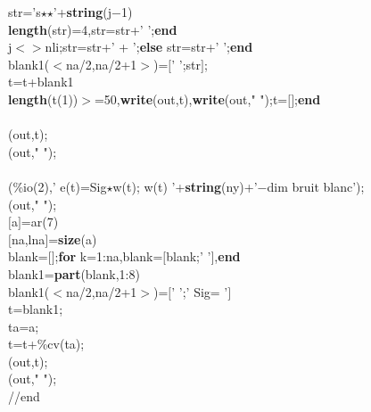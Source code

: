 {\begin{flushleft}
{\cmarg \hspace{1.0cm}str='s$\star$$\star$'+{\bf string}(j$-$1)\\ 
\cmarg \hspace{1.0cm}{\bf if} {\bf length}(str)=4,str=str+' ';{\bf end}\\ 
\cmarg \hspace{1.0cm}{\bf if} j$<$$>$nli;str=str+' + ';{\bf else} str=str+'   ';{\bf end}\\ 
\cmarg \hspace{1.0cm}blank1($<$na/2,na/2+1$>$)=$[$'        ';str$]$;\\ 
\cmarg \hspace{1.0cm}t=t+blank1\\ 
\cmarg \hspace{1.0cm}{\bf if} {\bf length}(t(1))$>$=50,{\bf write}(out,t),{\bf write}(out," ");t=$[$$]$;{\bf end}\\ 
\cmarg \hspace{0.5cm}{\bf end}\\ 
(out,t);\\ 
(out," ");\\ 
\\ 
(\%io(2),'  e(t)=Sig$\star$w(t); w(t) '+{\bf string}(ny)+'$-$dim bruit blanc');\\ 
(out," ");\\ 
\cmarg \hspace{0.5cm}$[$a$]$=ar(7)\\ 
\cmarg \hspace{0.5cm}$[$na,lna$]$={\bf size}(a)\\ 
\cmarg \hspace{0.5cm}blank=$[$$]$;{\bf for} k=1:na,blank=$[$blank;'           '$]$,{\bf end}\\ 
\cmarg \hspace{0.5cm}blank1={\bf part}(blank,1:8)\\ 
\cmarg \hspace{0.5cm}blank1($<$na/2,na/2+1$>$)=$[$'        ';'  Sig=  '$]$\\ 
\cmarg \hspace{0.5cm}t=blank1;\\ 
\cmarg \hspace{0.5cm}ta=a;\\ 
\cmarg \hspace{0.5cm}t=t+\%cv(ta);\\ 
(out,t);\\ 
(out," ");\\ 
\cmarg //end}
\end{flushleft}}



